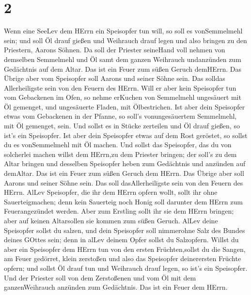 \hypertarget{section-1}{%
\section{2}\label{section-1}}

 Wenn eine SeeLev dem HErrn ein Speisopfer tun will, so soll
es vonSemmelmehl sein; und soll Öl drauf gießen und Weihrauch drauf
legen  und also bringen zu den Priestern, Aarons Söhnen. Da
soll der Priester seineHand voll nehmen von demselben Semmelmehl und Öl
samt dem ganzen Weihrauch undanzünden zum Gedächtnis auf dem Altar. Das
ist ein Feuer zum süßen Geruch demHErrn.  Das Übrige aber
vom Speisopfer soll Aarons und seiner Söhne sein. Das solldas
Allerheiligste sein von den Feuern des HErrn.  Will er aber
kein Speisopfer tun vom Gebackenen im Ofen, so nehme erKuchen von
Semmelmehl ungesäuert mit Öl gemenget, und ungesäuerte Fladen, mit
Ölbestrichen.  Ist aber dein Speisopfer etwas vom Gebackenen
in der Pfanne, so soll's vonungesäuertem Semmelmehl, mit Öl gemenget,
sein.  Und sollst es in Stücke zerteilen und Öl drauf
gießen, so ist's ein Speisopfer.  Ist aber dein Speisopfer
etwas auf dem Rost geröstet, so sollst du es vonSemmelmehl mit Öl
machen.  Und sollst das Speisopfer, das du von solcherlei
machen willst dem HErrn,zu dem Priester bringen; der soll's zu dem Altar
bringen  und desselben Speisopfer heben zum Gedächtnis und
anzünden auf demAltar. Das ist ein Feuer zum süßen Geruch dem HErrn.
 Das Übrige aber soll Aarons und seiner Söhne sein. Das
soll dasAllerheiligste sein von den Feuern des HErrn. 
AlLev Speisopfer, die ihr dem HErrn opfern wollt, sollt ihr ohne
Sauerteigmachen; denn kein Sauerteig noch Honig soll darunter dem HErrn
zum Feuerangezündet werden.  Aber zum Erstling sollt ihr
sie dem HErrn bringen; aber auf keinen Altarsollen sie kommen zum süßen
Geruch.  AlLev deine Speisopfer sollst du salzen, und dein
Speisopfer soll nimmerohne Salz des Bundes deines GOttes sein; denn in
alLev deinem Opfer sollst du Salzopfern.  Willst du aber
ein Speisopfer dem HErrn tun von den ersten Früchten,sollst du die
Sangen, am Feuer gedörret, klein zerstoßen und also das Speisopfer
deinerersten Früchte opfern;  und sollst Öl drauf tun und
Weihrauch drauf legen, so ist's ein Speisopfer.  Und der
Priester soll von dem Zerstoßenen und vom Öl mit dem ganzenWeihrauch
anzünden zum Gedächtnis. Das ist ein Feuer dem HErrn.

